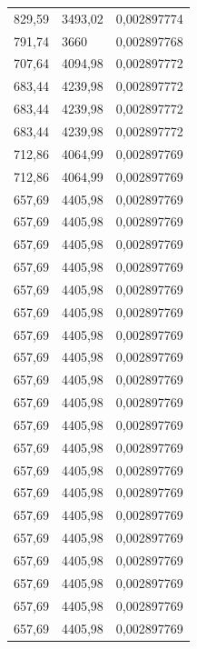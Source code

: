 \begin{center}
\begin{longtable}{|l|l|l|}
829,59            & 3493,02           & 0,002897774 \\
791,74            & 3660              & 0,002897768 \\
707,64            & 4094,98           & 0,002897772 \\
683,44            & 4239,98           & 0,002897772 \\
683,44            & 4239,98           & 0,002897772 \\
683,44            & 4239,98           & 0,002897772 \\
712,86            & 4064,99           & 0,002897769 \\
712,86            & 4064,99           & 0,002897769 \\
657,69            & 4405,98           & 0,002897769 \\
657,69            & 4405,98           & 0,002897769 \\
657,69            & 4405,98           & 0,002897769 \\
657,69            & 4405,98           & 0,002897769 \\
657,69            & 4405,98           & 0,002897769 \\
657,69            & 4405,98           & 0,002897769 \\
657,69            & 4405,98           & 0,002897769 \\
657,69            & 4405,98           & 0,002897769 \\
657,69            & 4405,98           & 0,002897769 \\
657,69            & 4405,98           & 0,002897769 \\
657,69            & 4405,98           & 0,002897769 \\
657,69            & 4405,98           & 0,002897769 \\
657,69            & 4405,98           & 0,002897769 \\
657,69            & 4405,98           & 0,002897769 \\
657,69            & 4405,98           & 0,002897769 \\
657,69            & 4405,98           & 0,002897769 \\
657,69            & 4405,98           & 0,002897769 \\
657,69            & 4405,98           & 0,002897769 \\
657,69            & 4405,98           & 0,002897769 \\
657,69            & 4405,98           & 0,002897769 \\

\end{longtable}
\end{center}
